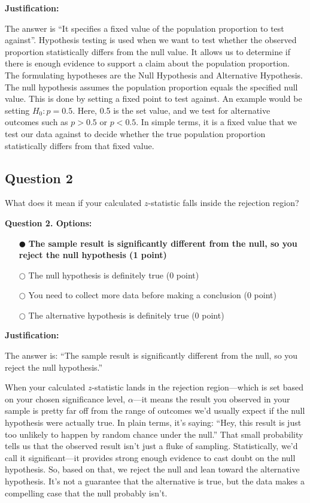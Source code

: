 \documentclass[12pt]{article}
\newcommand{\questionsep}{\vspace{1em}}
\begin{document}
\medskip\noindent\textbf{Justification:}

The answer is “It specifies a fixed value of the population proportion to test against”. Hypothesis testing is used when we want to test whether the observed proportion statistically differs from the null value. It allows us to determine if there is enough evidence to support a claim about the population proportion. The formulating hypotheses are the Null Hypothesis and Alternative Hypothesis. The null hypothesis assumes the population proportion equals the specified null value. This is done by setting a fixed point to test against. An example would be setting $H_0: p = 0.5$. Here, 0.5 is the set value, and we test for alternative outcomes such as $p > 0.5$ or $p < 0.5$. In simple terms, it is a fixed value that we test our data against to decide whether the true population proportion statistically differs from that fixed value.
\questionsep

\subsection*{Question 2 }
What does it mean if your calculated $z$-statistic falls inside the rejection region?

\medskip\noindent\textbf{Question 2. Options:}
\begin{itemize}[leftmargin=2em, labelsep=0.5em, itemsep=0.3em, topsep=0.3em]
    \item[$\mdlgblkcircle$] \textbf{The sample result is significantly different from the null, so you reject the null hypothesis (1 point)}
    \item[$\bigcirc$] The null hypothesis is definitely true (0 point)
    \item[$\bigcirc$] You need to collect more data before making a conclusion (0 point)
    \item[$\bigcirc$] The alternative hypothesis is definitely true (0 point)
\end{itemize}

\medskip\noindent\textbf{Justification:}

The answer is: “The sample result is significantly different from the null, so you reject the null hypothesis.”

When your calculated $z$-statistic lands in the rejection region—which is set based on your chosen significance level, $\alpha$—it means the result you observed in your sample is pretty far off from the range of outcomes we’d usually expect if the null hypothesis were actually true. In plain terms, it’s saying: “Hey, this result is just too unlikely to happen by random chance under the null.” That small probability tells us that the observed result isn’t just a fluke of sampling. Statistically, we’d call it significant—it provides strong enough evidence to cast doubt on the null hypothesis. So, based on that, we reject the null and lean toward the alternative hypothesis. It’s not a guarantee that the alternative is true, but the data makes a compelling case that the null probably isn’t.
\end{document}
